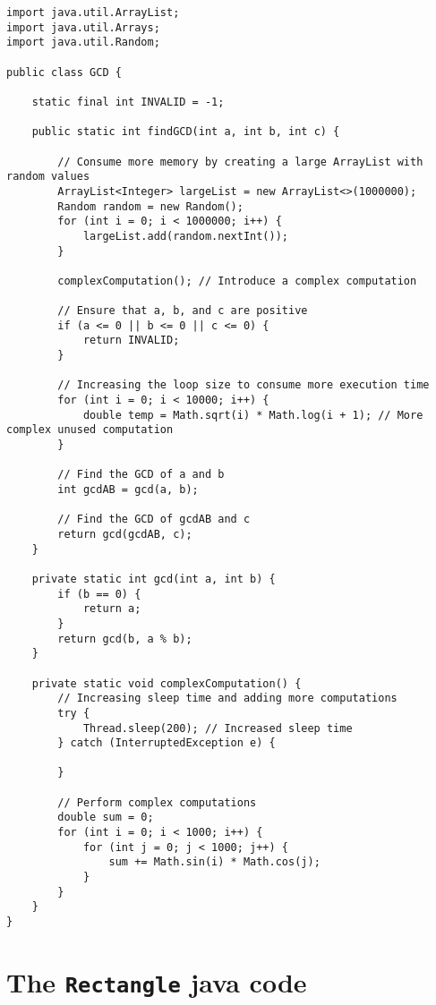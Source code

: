 \begin{lstlisting}
import java.util.ArrayList;
import java.util.Arrays;
import java.util.Random;

public class GCD {

    static final int INVALID = -1;

    public static int findGCD(int a, int b, int c) {

        // Consume more memory by creating a large ArrayList with random values
        ArrayList<Integer> largeList = new ArrayList<>(1000000);
        Random random = new Random();
        for (int i = 0; i < 1000000; i++) {
            largeList.add(random.nextInt());
        }

        complexComputation(); // Introduce a complex computation

        // Ensure that a, b, and c are positive
        if (a <= 0 || b <= 0 || c <= 0) {
            return INVALID;
        }

        // Increasing the loop size to consume more execution time
        for (int i = 0; i < 10000; i++) { 
            double temp = Math.sqrt(i) * Math.log(i + 1); // More complex unused computation
        }

        // Find the GCD of a and b
        int gcdAB = gcd(a, b);

        // Find the GCD of gcdAB and c
        return gcd(gcdAB, c);
    }

    private static int gcd(int a, int b) {
        if (b == 0) {
            return a;
        }
        return gcd(b, a % b);
    }

    private static void complexComputation() {
        // Increasing sleep time and adding more computations
        try {
            Thread.sleep(200); // Increased sleep time
        } catch (InterruptedException e) {

        }

        // Perform complex computations
        double sum = 0;
        for (int i = 0; i < 1000; i++) {
            for (int j = 0; j < 1000; j++) {
                sum += Math.sin(i) * Math.cos(j);
            }
        }
    }
}
\end{lstlisting}

\section{The \texttt{Rectangle} java code} \label{sec:rectangle}

